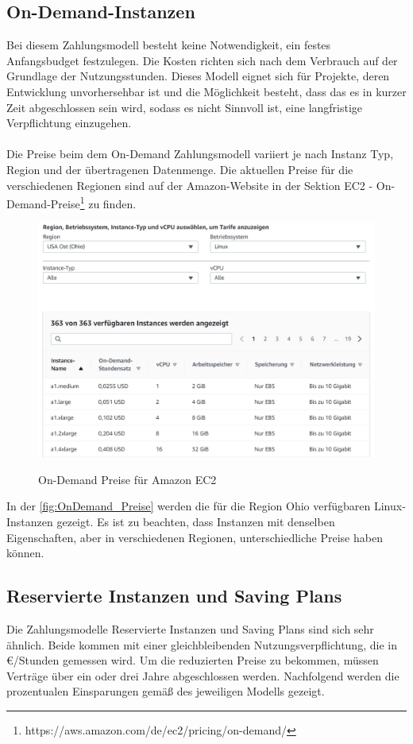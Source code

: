 \subsection{On-Demand-Instanzen}
Bei diesem Zahlungsmodell besteht keine Notwendigkeit, ein festes Anfangsbudget festzulegen. Die Kosten richten sich nach dem Verbrauch auf der Grundlage der Nutzungsstunden. Dieses Modell eignet sich für Projekte, deren Entwicklung unvorhersehbar ist und die Möglichkeit besteht, dass das es in kurzer Zeit abgeschlossen sein wird, sodass es nicht Sinnvoll ist, eine langfristige Verpflichtung einzugehen.
\\\\
Die Preise beim dem On-Demand Zahlungsmodell variiert je nach Instanz Typ, Region und der übertragenen Datenmenge. Die aktuellen Preise für die verschiedenen Regionen sind auf der Amazon-Website in der Sektion EC2 - On-Demand-Preise\footnote{https://aws.amazon.com/de/ec2/pricing/on-demand/} zu finden. 
\begin{figure}
    \centering
    \includegraphics[scale=0.5]{sources/On-Demand-Pläne für Amazon EC2}\label{fig:OnDemand_Preise}\\
    \caption[On-Demand Preise für Amazon EC2]{}
    \label{fig:OnDemand_Preise}  On-Demand Preise für Amazon EC2 {\cite{AMZ02}}
  \end{figure}
In der \autoref{fig:OnDemand_Preise} werden die für die Region Ohio verfügbaren Linux-Instanzen gezeigt. Es ist zu beachten, dass Instanzen mit denselben Eigenschaften, aber in verschiedenen Regionen, unterschiedliche Preise haben können.
\subsection{Reservierte Instanzen und Saving Plans}
Die Zahlungsmodelle Reservierte Instanzen und Saving Plans sind sich sehr ähnlich. Beide kommen mit einer gleichbleibenden  Nutzungsverpflichtung, die in €/Stunden gemessen wird. Um die reduzierten Preise  zu bekommen, müssen Verträge über ein oder drei Jahre abgeschlossen werden. Nachfolgend werden die prozentualen Einsparungen gemäß des jeweiligen Modells gezeigt.

